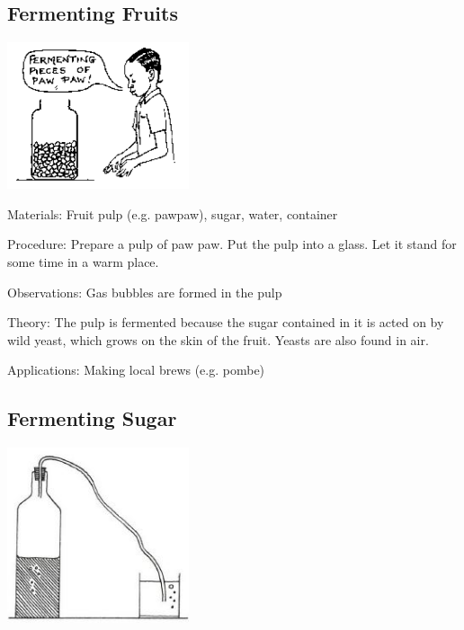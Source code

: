 \begin{multicols}{2}
\columnbreak

\subsection{Fermenting Fruits} %

\begin{center}
\includegraphics[width=0.4\textwidth]{./img/source/fermenting-fruits.png}
\end{center}

\begin{description*}
\item[Materials:]{Fruit pulp (e.g. pawpaw), sugar, water, container}
\item[Procedure:]{Prepare a pulp of paw paw. Put the pulp into a glass. Let it stand for some time in a warm
place.}
\item[Observations:]{Gas bubbles are formed in the pulp}
\item[Theory:]{The pulp is fermented because the sugar contained in it is acted on by wild yeast, which
grows on the skin of the fruit. Yeasts are also found in air.}
\item[Applications:]{Making local brews (e.g. pombe)}
\end{description*}

\subsection{Fermenting Sugar}

\begin{center}
\includegraphics[width=0.4\textwidth]{./img/vso/fermentation.jpg}
\end{center}


\end{multicols}
